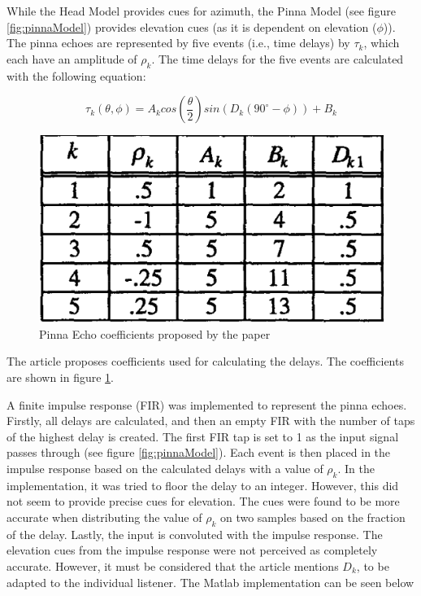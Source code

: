 \documentclass{assignment}
\begin{document}
While the Head Model provides cues for azimuth, the Pinna Model (see figure \ref{fig:pinnaModel}) provides elevation cues (as it is dependent on elevation ($\phi$)). The pinna echoes are represented by five events (i.e., time delays) by $\tau_{k}$, which each have an amplitude of $\rho_{k}$. The time delays for the five events are calculated with the following equation: 

\[\tau_{k}(\theta,\phi) = A_{k}cos(\frac{\theta}{2})sin(D_{k}(90^{\circ} - \phi)) + B_{k}\]

\begin{figure}[h]
    \centering
    \includegraphics[scale = 0.8]{assets/coeffecient.png}
    \caption{Pinna Echo coefficients proposed by the paper}
    \label{fig:coefficients}
\end{figure}

The article proposes coefficients used for calculating the delays. The coefficients are shown in figure \ref{fig:coefficients}. \newline

A finite impulse response (FIR) was implemented to represent the pinna echoes. Firstly, all delays are calculated, and then an empty FIR with the number of taps of the highest delay is created. The first FIR tap is set to 1 as the input signal passes through (see figure \ref{fig:pinnaModel}). Each event is then placed in the impulse response based on the calculated delays with a value of $\rho_{k}$. In the implementation, it was tried to floor the delay to an integer. However, this did not seem to provide precise cues for elevation. The cues were found to be more accurate when distributing the value of $\rho_{k}$ on two samples based on the fraction of the delay. Lastly, the input is convoluted with the impulse response. The elevation cues from the impulse response were not perceived as completely accurate. However, it must be considered that the article mentions $D_{k}$, to be adapted to the individual listener. The Matlab implementation can be seen below
\end{document}
